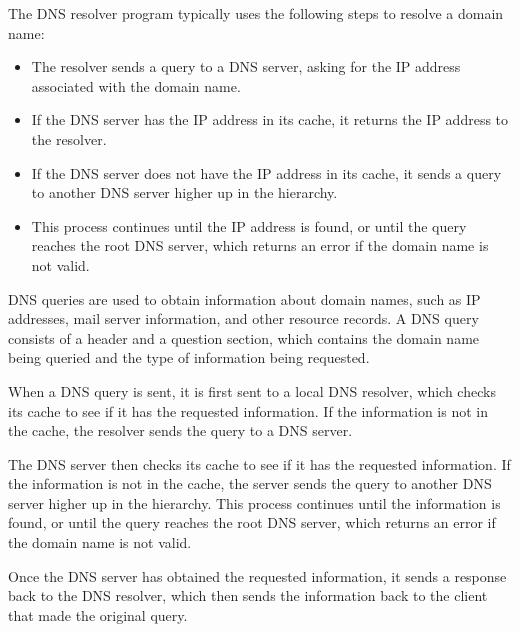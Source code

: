 \documentclass[a4paper, 11pt]{article}
\begin{document}
        The DNS resolver program typically uses the following steps to resolve a domain name:
        \begin{itemize}
            \item The resolver sends a query to a DNS server, asking for the IP address associated with the domain name.
            \item If the DNS server has the IP address in its cache, it returns the IP address to the resolver.
            \item If the DNS server does not have the IP address in its cache, it sends a query to another DNS server higher up in the hierarchy.
            \item This process continues until the IP address is found, or until the query reaches the root DNS server, 
                which returns an error if the domain name is not valid.
        \end{itemize}


        DNS queries are used to obtain information about domain names, such as IP addresses, mail server information, and other resource records.
        A DNS query consists of a header and a question section, which contains the domain name being queried and the type of information being requested.

        When a DNS query is sent, it is first sent to a local DNS resolver, which checks its cache to see if it has the requested information.
        If the information is not in the cache, the resolver sends the query to a DNS server.

        The DNS server then checks its cache to see if it has the requested information.
        If the information is not in the cache, the server sends the query to another DNS server higher up in the hierarchy.
        This process continues until the information is found, or until the query reaches the root DNS server, which returns an error if the domain name is not valid.

        Once the DNS server has obtained the requested information, it sends a response back to the DNS resolver, 
        which then sends the information back to the client that made the original query.
\end{document}
